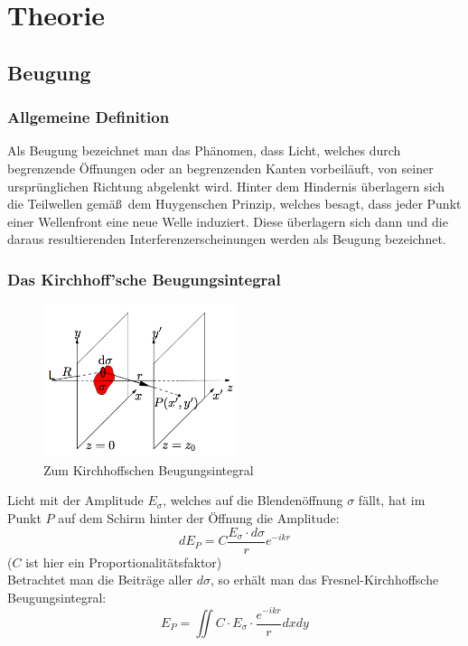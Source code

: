 \section{Theorie}

\subsection{Beugung}

\subsubsection{Allgemeine Definition}

Als Beugung bezeichnet man das Ph\"anomen, dass Licht, welches durch begrenzende \"Offnungen oder an begrenzenden Kanten vorbeil\"auft, von seiner urspr\"unglichen Richtung abgelenkt wird. Hinter dem Hindernis \"uberlagern sich die Teilwellen gem\"a\ss \ dem Huygenschen Prinzip, welches besagt, dass jeder Punkt einer Wellenfront eine neue Welle induziert. Diese \"uberlagern sich dann und die daraus resultierenden Interferenzerscheinungen werden als Beugung bezeichnet.

\subsubsection{Das Kirchhoff'sche Beugungsintegral}

\begin{figure}[H]
	\centering \includegraphics[width=0.5\textwidth]{Bilder/Beugungsintegral.jpg}
	\caption{Zum Kirchhoffschen Beugungsintegral}
\end{figure}

Licht mit der Amplitude $E_\sigma$, welches auf die Blenden\"offnung $\sigma$ f\"allt, hat im Punkt $P$ auf dem Schirm hinter der \"Offnung die Amplitude: $$dE_P = C\frac{E_\sigma \cdot d\sigma}{r}e^{-ikr}$$
($C$ ist hier ein Proportionalit\"atsfaktor)\\
Betrachtet man die Beitr\"age aller $d\sigma$, so erh\"alt man das Fresnel-Kirchhoffsche Beugungsintegral:
$$E_P=\iint C\cdot E_\sigma \cdot \frac{e^{-ikr}}{r}dxdy$$

